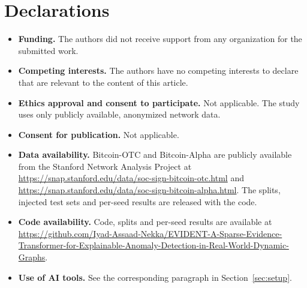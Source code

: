 \documentclass[pdflatex,sn-basic]{sn-jnl}
\theoremstyle{definition}
\theoremstyle{plain}
\begin{document}
\backmatter

\section*{Declarations}

\begin{itemize}
\item \textbf{Funding.} The authors did not receive support from any
organization for the submitted work.
\item \textbf{Competing interests.} The authors have no competing interests
to declare that are relevant to the content of this article.
\item \textbf{Ethics approval and consent to participate.} Not applicable. The
study uses only publicly available, anonymized network data.
\item \textbf{Consent for publication.} Not applicable.
\item \textbf{Data availability.} Bitcoin-OTC and Bitcoin-Alpha are publicly
available from the Stanford Network Analysis Project at
\url{https://snap.stanford.edu/data/soc-sign-bitcoin-otc.html} and
\url{https://snap.stanford.edu/data/soc-sign-bitcoin-alpha.html}. The splits,
injected test sets and per-seed results are released with the code.
\item \textbf{Code availability.} Code, splits and per-seed results are
available at
\url{https://github.com/Iyad-Assaad-Nekka/EVIDENT-A-Sparse-Evidence-Transformer-for-Explainable-Anomaly-Detection-in-Real-World-Dynamic-Graphs}.
\item \textbf{Use of AI tools.} See the corresponding paragraph in
Section~\ref{sec:setup}.
\end{itemize}
\end{document}
